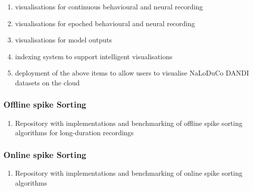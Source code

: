 \begin{enumerate}

    \item visualisations for continuous behavioural and neural recording

    \item visualisations for epoched behavioural and neural recording

    \item visualisations for model outputs

    \item indexing system to support intelligent visualisations

    \item deployment of the above items to allow users to visualise NaLoDuCo
        DANDI datasets on the cloud

\end{enumerate}

\subsubsection{Offline spike Sorting}
\label{sec:offlineSpikeSorting}


\begin{enumerate}

    \item Repository with implementations and benchmarking of offline spike
        sorting algorithms for long-duration recordings

\end{enumerate}

\subsubsection{Online spike Sorting}
\label{sec:onlineSpikeSorting}


\begin{enumerate}

    \item Repository with implementations and benchmarking of online spike
        sorting algorithms

\end{enumerate}

